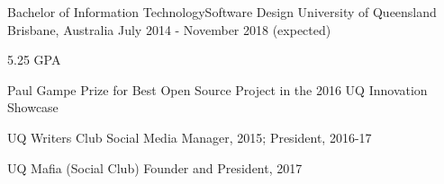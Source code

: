 


\begin{cventries}


\cventry
{Bachelor of Information Technology{\enskip\cdotp\enskip}Software Design} %
{University of Queensland} %
{Brisbane, Australia} %
{July 2014 - November 2018 (expected)} %
{ %
\begin{cvitems}
\item 5.25 GPA
\item {Paul Gampe Prize for Best Open Source Project in the 2016 UQ Innovation Showcase}
\item {UQ Writers Club Social Media Manager, 2015; President, 2016-17}
\item {UQ Mafia (Social Club) Founder and President, 2017}
\end{cvitems}
}


\end{cventries}
